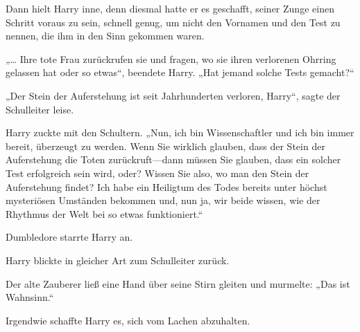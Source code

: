 Dann hielt Harry inne, denn diesmal hatte er es geschafft, seiner Zunge einen Schritt voraus zu sein, schnell genug, um nicht den Vornamen und den Test zu nennen, die ihm in den Sinn gekommen waren.

„… Ihre tote Frau zurückrufen sie und fragen, wo sie ihren verlorenen Ohrring gelassen hat oder so etwas“, beendete Harry. „Hat jemand solche Tests gemacht?“

„Der Stein der Auferstehung ist seit Jahrhunderten verloren, Harry“, sagte der Schulleiter leise.

Harry zuckte mit den Schultern. „Nun, ich bin Wissenschaftler und ich bin immer bereit, überzeugt zu werden. Wenn Sie wirklich glauben, dass der Stein der Auferstehung die Toten zurückruft—dann müssen Sie glauben, dass ein solcher Test erfolgreich sein wird, oder? Wissen Sie also, wo man den Stein der Auferstehung findet? Ich habe ein Heiligtum des Todes bereits unter höchst mysteriösen Umständen bekommen und, nun ja, wir beide wissen, wie der Rhythmus der Welt bei so etwas funktioniert.“

Dumbledore starrte Harry an.

Harry blickte in gleicher Art zum Schulleiter zurück.

Der alte Zauberer ließ eine Hand über seine Stirn gleiten und murmelte: „Das ist Wahnsinn.“

Irgendwie schaffte Harry es, sich vom Lachen abzuhalten.

